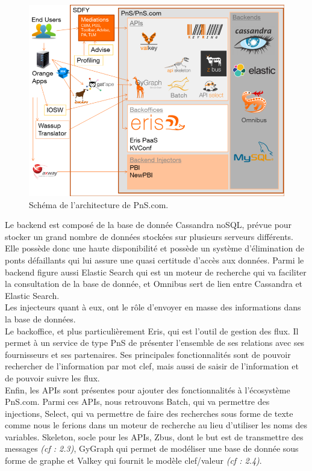 
\begin{figure}[htp]
  \centering
  \includegraphics[width=15cm]{images/pns/psn.png}
  \caption{Schéma de l'architecture de PnS.com.}
  \label{pns}
\end{figure}


Le backend est composé de la base de donnée Cassandra noSQL, prévue pour stocker un grand nombre de données stockées sur plusieurs serveurs différents. Elle possède donc une haute disponibilité et possède un système d'élimination de ponts défaillants qui lui assure une quasi certitude d'accès aux données. Parmi le backend figure aussi Elastic Search qui est un moteur de recherche qui va faciliter la consultation de la base de donnée, et Omnibus sert de lien entre Cassandra et Elastic Search.\\

Les injecteurs quant à eux, ont le rôle d'envoyer en masse des informations dans la base de données.\\

Le backoffice, et plus particulièrement Eris, qui est l'outil de gestion des flux. Il permet à un service de type PnS de présenter l'ensemble de ses relations avec ses fournisseurs et ses partenaires. Ses principales fonctionnalités sont de pouvoir rechercher de l'information par mot clef, mais aussi de saisir de l'information et de pouvoir suivre les flux.\\

Enfin, les APIs sont présentes pour ajouter des fonctionnalités à l'écosystème PnS.com. Parmi ces APIs, nous retrouvons Batch, qui va permettre des injections, Select, qui va permettre de faire des recherches sous forme de texte comme nous le ferions dans un moteur de recherche au lieu d'utiliser les noms des variables. Skeleton, socle pour les APIs, Zbus, dont le but est de transmettre des messages \textit{(cf : 2.3)}, GyGraph qui permet de modéliser une base de donnée sous forme de graphe et Valkey qui fournit le modèle clef/valeur \textit{(cf : 2.4)}.\\

